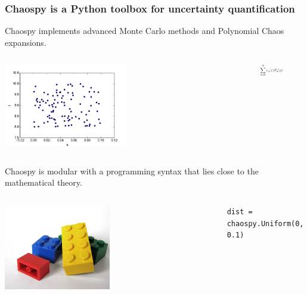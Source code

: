 \documentclass[handout]{beamer}
\begin{document}
 \begin{frame}
 \frametitle{Chaospy is a Python toolbox for uncertainty quantification}

 Chaospy implements advanced Monte Carlo methods and Polynomial Chaos expansions.

 \begin{columns}
      \begin{center}
                 \includegraphics[width=0.5\textwidth]{samples.png}
      \end{center}
      \begin{center}
                   \includegraphics[width=0.5\textwidth]{pc.png}
      \end{center}
  \end{columns}

  \vspace{5mm}
\pause
Chaospy is modular with a programming syntax that lies close to the mathematical theory.

\begin{columns}
     \begin{center}
                \includegraphics[width=0.5\textwidth]{lego.jpg}
     \end{center}
     \begin{center}

  \lstinline|dist = chaospy.Uniform(0, 0.1)|

    \end{center}

 \end{columns}

 \end{frame}
\end{document}
